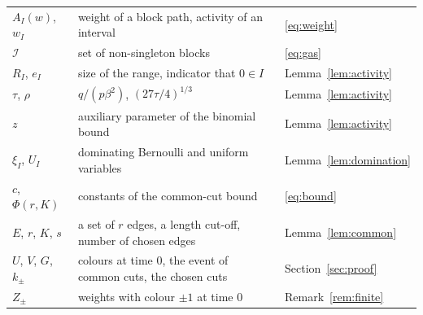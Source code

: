 \documentclass[11pt]{amsart}
\theoremstyle{remark}
\begin{document}
\begin{center}
\begin{tabular}{p{3.0cm}p{8.0cm}p{3.1cm}}
$A_I(w)$, $w_I$ & weight of a block path, activity of an interval & \eqref{eq:weight}\\
$\mathcal I$ & set of non-singleton blocks & \eqref{eq:gas}\\
$R_I$, $e_I$ & size of the range, indicator that $0\in I$ & Lemma~\ref{lem:activity}\\
$\tau$, $\rho$ & $q/(p\beta^2)$, $(27\tau/4)^{1/3}$ & Lemma~\ref{lem:activity}\\
$z$ & auxiliary parameter of the binomial bound & Lemma~\ref{lem:activity}\\
$\xi_I$, $U_I$ & dominating Bernoulli and uniform variables & Lemma~\ref{lem:domination}\\
$c$, $\Phi(r,K)$ & constants of the common-cut bound & \eqref{eq:bound}\\
$E$, $r$, $K$, $s$ & a set of $r$ edges, a length cut-off, number of chosen edges & Lemma~\ref{lem:common}\\
$U$, $V$, $G$, $k_\pm$ & colours at time $0$, the event of common cuts, the chosen cuts & Section~\ref{sec:proof}\\
$Z_\pm$ & weights with colour $\pm1$ at time $0$ & Remark~\ref{rem:finite}\\
\bottomrule
\end{tabular}
\end{center}
\end{document}
